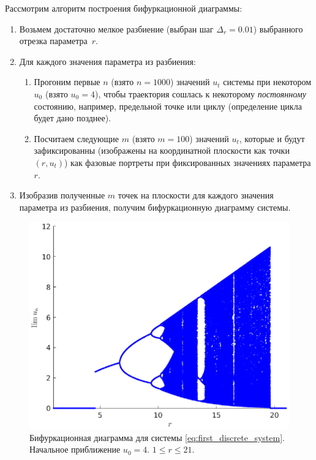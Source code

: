 Рассмотрим алгоритм построения бифуркационной диаграммы:
\begin{enumerate}
        \item Возьмем достаточно мелкое разбиение (выбран шаг $\Delta_r = 0.01$) выбранного отрезка параметра~$r$.
        \item Для каждого значения параметра из разбиения:
        \begin{enumerate}
                \item Прогоним первые $n$ (взято $n = 1000$) значений $u_t$ системы при некотором $u_0$ (взято $u_0 = 4$), чтобы траектория сошлась к некоторому \textit{постоянному} состоянию, например, предельной точке или циклу (определение цикла будет дано позднее).
                \item Посчитаем следующие $m$ (взято $m = 100$) значений $u_t$, которые и будут зафиксированны (изображены на координатной плоскости как точки $(r, u_t)$) как фазовые портреты при фиксированных значениях параметра $r$.
        \end{enumerate}
        \item Изобразив полученные $m$ точек на плоскости для каждого значения параметра из разбиения, получим бифуркационную диаграмму системы.
\end{enumerate}

\begin{figure}[h]
        \centering
        \includegraphics[width=0.8\linewidth]{img/one_step_bifurcation.eps}
        \caption{Бифуркационная диаграмма для системы \ref{eq:first_discrete_system}. Начальное приближение $u_0 = 4$. $1 \leqslant r \leqslant 21$.}
        \label{img:one_step_bifurcation}
\end{figure}